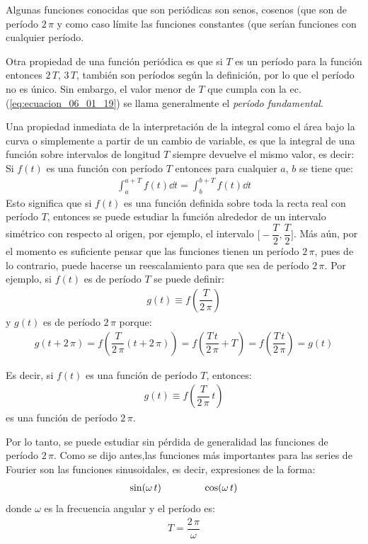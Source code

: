 Algunas funciones conocidas que son periódicas son senos, cosenos (que son de período $2 \, \pi$ y como caso límite las funciones constantes (que serían funciones con cualquier período.
\par
Otra propiedad de una función periódica es que si $T$ es un período para la función entonces $2 \, T$, $3 \, T$, también son períodos según la definición, por lo que el período no es único. Sin embargo, el valor menor de $T$ que cumpla con la ec. (\ref{eq:ecuacion_06_01_19}) se llama generalmente el \emph{período fundamental}.
\par
Una propiedad inmediata de la interpretación de la integral como el área bajo la curva o simplemente a partir de un cambio de variable, es que la integral de una función sobre intervalos de longitud $T$ siempre devuelve el mismo valor, es decir: Si $f(t)$ es una función con período $T$ entonces para cualquier $a$, $b$ se tiene que:
\begin{align*}
\int_{a}^{a+T} f(t) \dd{t} = \int_{b}^{b+T} f(t) \dd{t}
\end{align*}
Esto significa que si $f(t)$ es una función definida sobre toda la recta real con período $T$, entonces se puede estudiar la función alrededor de un intervalo simétrico con respecto al origen, por ejemplo, el intervalo $\bigg[-\dfrac{T}{2}, \dfrac{T}{2} \bigg]$. Más aún, por el momento es suficiente pensar que las funciones tienen un período $2 \, \pi$, pues de lo contrario, puede hacerse un reescalamiento para que sea de período $2 \, \pi$. Por ejemplo, si $f(t)$ es de período $T$ se puede definir:
\begin{align*}
g(t) \equiv f \left( \dfrac{T}{2 \, \pi} \right)
\end{align*}
y $g(t)$ es de período $2 \, \pi$ porque:
\begin{align*}
g(t + 2 \, \pi) = f \left( \dfrac{T}{2 \, \pi} (t + 2 \, \pi) \right) = f \left( \dfrac{T \, t}{2 \, \pi} + T \right) = f \left( \dfrac{T \, t}{2 \, \pi} \right) = g(t)
\end{align*}

Es decir, si $f(t)$ es una función de período $T$, entonces:
\begin{align*}
g(t) \equiv f \left( \dfrac{T}{2 \, \pi} \, t \right)
\end{align*}
es una función de período $2 \, \pi$.
\par
Por lo tanto, se puede estudiar sin pérdida de generalidad las funciones de período $2 \, \pi$. Como se dijo antes,las funciones más importantes para las series de Fourier son las funciones sinusoidales, es decir, expresiones de la forma:
\begin{align*}
\sin (\omega \, t) \hspace{1.5cm} \cos (\omega \, t)
\end{align*}
donde $\omega$ es la frecuencia angular y el período es:
\begin{align*}
T = \dfrac{2 \, \pi}{\omega}
\end{align*}

